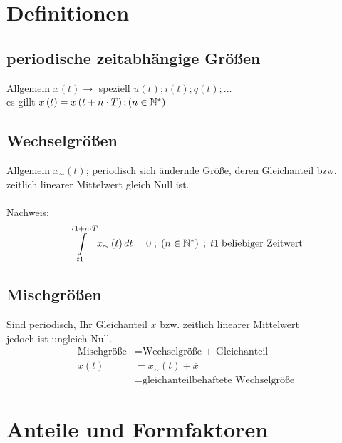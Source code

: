 \section{Definitionen}

\subsection{periodische zeitabhängige Größen}
Allgemein \(x\left(t\right) \xrightarrow{}\) speziell \(u\left(t\right); i\left(t\right); q\left(t\right); \dots\) \\
es gillt \(x\left(t\right) = x\left(t + n \cdot T\right) ; \left(n \in \mathbb{N}^* \right) \)

\subsection{Wechselgrößen}
Allgemein \(x_{\sim} \left(t\right)\); periodisch sich ändernde Größe, deren Gleichanteil bzw. 
zeitlich linearer Mittelwert gleich Null ist. \\ \vspace{0mm} \\
Nachweis: \[\int\limits_{t1}^{t1 + n \cdot T} x_{\sim} \left(t\right)dt = 0 \; ; \; \left(n \in \mathbb{N}^* \right) \;
; \; t1 \; \text{beliebiger Zeitwert}\]

\subsection{Mischgrößen}
Sind periodisch, Ihr Gleichanteil \(\overline{x}\) bzw. zeitlich linearer Mittelwert \\
jedoch ist ungleich Null. 
\begin{align*}
\text{Mischgröße} &= \text{Wechselgröße + Gleichanteil} \\
x\left(t\right) &= x_{\sim}\left(t\right) + \overline{x} \\
&= \text{gleichanteilbehaftete Wechselgröße}
\end{align*}

\newpage
\section{Anteile und Formfaktoren}

